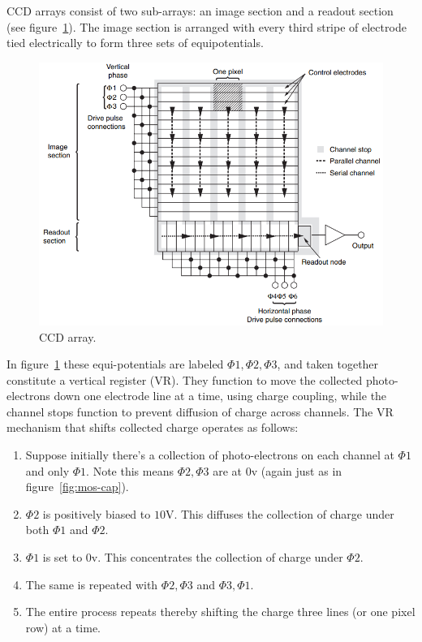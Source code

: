 CCD arrays consist of two sub-arrays: an image section and a readout section (see figure~\ref{fig:ccd-array}).
%
The image section is arranged with every third stripe of electrode tied electrically to form three sets of equipotentials.
\begin{figure}
	\includegraphics[width=\linewidth,keepaspectratio]{figures/background/ccd_array.png}
	\caption{CCD array\cite{pawley1995handbook}.}
	\label{fig:ccd-array}
\end{figure}
%
In figure~\ref{fig:ccd-array} these equi-potentials are labeled \(\Phi1, \Phi2, \Phi3\), and taken together constitute a vertical register (VR).
%
They function to move the collected photo-electrons down one electrode line at a time, using charge coupling, while the channel stops function to prevent diffusion of charge across channels.
%
The VR mechanism that shifts collected charge operates as follows:
\begin{framed}
\begin{enumerate}
	\item Suppose initially there's a collection of photo-electrons on each channel at \(\Phi1\) and only \(\Phi1\). Note this means \(\Phi2, \Phi3\) are at \(0\)v (again just as in figure~\ref{fig:mos-cap}).
	\item \(\Phi2\) is positively biased to \(10\)V. This diffuses the collection of charge under both \(\Phi1\) and \(\Phi2\).
	\item \(\Phi1\) is set to \(0\)v. This concentrates the collection of charge under \(\Phi2\).
	\item The same is repeated with \(\Phi2, \Phi3\) and \(\Phi3, \Phi1\).
	\item The entire process repeats thereby shifting the charge three lines (or one pixel row) at a time.
\end{enumerate}
\end{framed}
